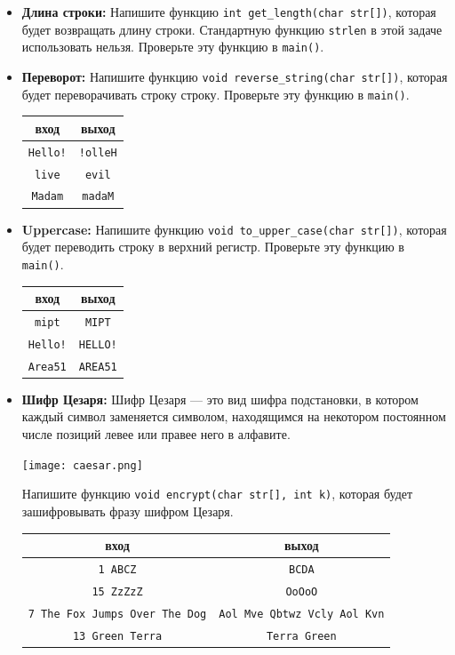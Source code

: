 \documentclass{article}
\begin{document}
\begin{itemize}
\item \textbf{Длина строки:} Напишите функцию \texttt{int get\_length(char str[])}, которая будет возвращать длину строки. Стандартную функцию \texttt{strlen} в этой задаче использовать нельзя. Проверьте эту функцию в \texttt{main()}.

\item \textbf{Переворот:} Напишите функцию \texttt{void reverse\_string(char str[])}, которая будет переворачивать строку строку. Проверьте эту функцию в \texttt{main()}.
\begin{center}
\begin{tabular}{ c | c }
 вход & выход \\ \hline
 \texttt{Hello!} & \texttt{!olleH}  \\ 
 \texttt{live} & \texttt{evil}  \\ 
 \texttt{Madam} & \texttt{madaM}  \\ 
\end{tabular}
\end{center}

\item \textbf{Uppercase:} Напишите функцию \texttt{void to\_upper\_case(char str[])}, которая будет переводить строку в верхний регистр. Проверьте эту функцию в \texttt{main()}.
\begin{center}
\begin{tabular}{ c | c }
 вход & выход \\ \hline
 \texttt{mipt} & \texttt{MIPT} \\
 \texttt{Hello!} & \texttt{HELLO!}  \\ 
 \texttt{Area51} & \texttt{AREA51} \\
\end{tabular}
\end{center}


\item \textbf{Шифр Цезаря:} Шифр Цезаря — это вид шифра подстановки, в котором каждый символ заменяется символом, находящимся на некотором постоянном числе позиций левее или правее него в алфавите. 
\begin{center}
\texttt{[image: caesar.png]}
\end{center}
Напишите функцию \texttt{void encrypt(char str[], int k)}, которая будет зашифровывать фразу шифром Цезаря.
\begin{center}
\begin{tabular}{ c | c }
 вход & выход \\ \hline
 \texttt{1 ABCZ} & \texttt{BCDA}\\
 \texttt{15 ZzZzZ} & \texttt{OoOoO} \\
 \texttt{7 The Fox Jumps Over The Dog} & \texttt{Aol Mve Qbtwz Vcly Aol Kvn} \\
 \texttt{13  Green Terra} & \texttt{Terra Green}
\end{tabular}
\end{center}


\end{itemize}
\end{document}
